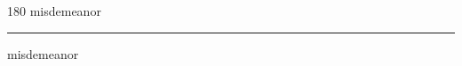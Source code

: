
\begin{frame}
\begin{center}
\begin{turn}{180}
{\fontsize{2.5cm}{1em}\selectfont misdemeanor}
\end{turn}
\vspace{1em}\par  
\hrule
\vspace{1em}\par  
{\fontsize{2.5cm}{1em}\selectfont misdemeanor}
\end{center}
\end{frame}
